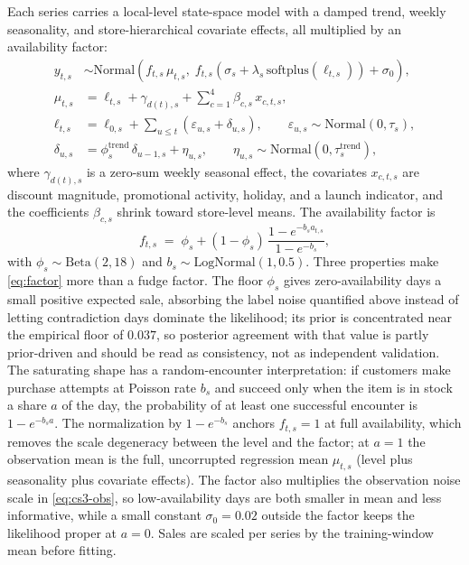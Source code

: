 Each series carries a local-level state-space model with a damped trend, weekly seasonality, and store-hierarchical covariate effects, all multiplied by an availability factor:
\begin{align}
y_{t,s} &\sim \text{Normal}\!\left( f_{t,s} \, \mu_{t,s}, \; f_{t,s} \left( \sigma_s + \lambda_s \, \text{softplus}(\ell_{t,s}) \right) + \sigma_0 \right), \label{eq:cs3-obs} \\
\mu_{t,s} &= \ell_{t,s} + \gamma_{d(t),s} + \textstyle\sum_{c=1}^{4} \beta_{c,s} \, x_{c,t,s}, \\
\ell_{t,s} &= \ell_{0,s} + \textstyle\sum_{u \leq t} (\varepsilon_{u,s} + \delta_{u,s}), \qquad \varepsilon_{u,s} \sim \text{Normal}(0, \tau_s), \\
\delta_{u,s} &= \phi^{\text{trend}}_s \, \delta_{u-1,s} + \eta_{u,s}, \qquad \eta_{u,s} \sim \text{Normal}(0, \tau^{\text{trend}}_s),
\end{align}
where $\gamma_{d(t),s}$ is a zero-sum weekly seasonal effect, the covariates $x_{c,t,s}$ are discount magnitude, promotional activity, holiday, and a launch indicator, and the coefficients $\beta_{c,s}$ shrink toward store-level means. The availability factor is
\begin{equation}\label{eq:factor}
f_{t,s} \;=\; \phi_s + (1 - \phi_s) \, \frac{1 - e^{-b_s a_{t,s}}}{1 - e^{-b_s}},
\end{equation}
with $\phi_s \sim \text{Beta}(2, 18)$ and $b_s \sim \text{LogNormal}(1, 0.5)$. Three properties make \eqref{eq:factor} more than a fudge factor. The floor $\phi_s$ gives zero-availability days a small positive expected sale, absorbing the label noise quantified above instead of letting contradiction days dominate the likelihood; its prior is concentrated near the empirical floor of $0.037$, so posterior agreement with that value is partly prior-driven and should be read as consistency, not as independent validation. The saturating shape has a random-encounter interpretation: if customers make purchase attempts at Poisson rate $b_s$ and succeed only when the item is in stock a share $a$ of the day, the probability of at least one successful encounter is $1 - e^{-b_s a}$. The normalization by $1 - e^{-b_s}$ anchors $f_{t,s} = 1$ at full availability, which removes the scale degeneracy between the level and the factor; at $a = 1$ the observation mean is the full, uncorrupted regression mean $\mu_{t,s}$ (level plus seasonality plus covariate effects). The factor also multiplies the observation noise scale in \eqref{eq:cs3-obs}, so low-availability days are both smaller in mean and less informative, while a small constant $\sigma_0 = 0.02$ outside the factor keeps the likelihood proper at $a = 0$. Sales are scaled per series by the training-window mean before fitting.

